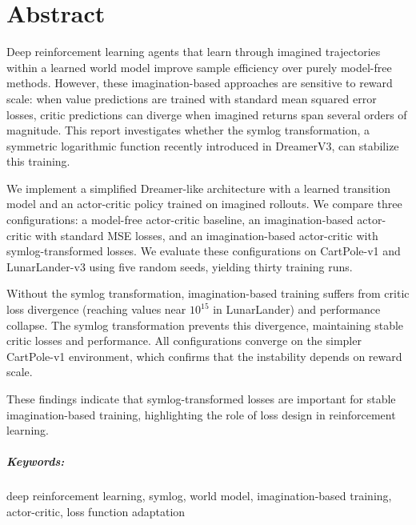 \chapter*{\center \Large Abstract}

Deep reinforcement learning agents that learn through imagined trajectories within a learned world model improve sample efficiency over purely model-free methods. However, these imagination-based approaches are sensitive to reward scale: when value predictions are trained with standard mean squared error losses, critic predictions can diverge when imagined returns span several orders of magnitude. This report investigates whether the symlog transformation, a symmetric logarithmic function recently introduced in DreamerV3, can stabilize this training.

We implement a simplified Dreamer-like architecture with a learned transition model and an actor-critic policy trained on imagined rollouts. We compare three configurations: a model-free actor-critic baseline, an imagination-based actor-critic with standard MSE losses, and an imagination-based actor-critic with symlog-transformed losses. We evaluate these configurations on CartPole-v1 and LunarLander-v3 using five random seeds, yielding thirty training runs.

Without the symlog transformation, imagination-based training suffers from critic loss divergence (reaching values near $10^{15}$ in LunarLander) and performance collapse. The symlog transformation prevents this divergence, maintaining stable critic losses and performance. All configurations converge on the simpler CartPole-v1 environment, which confirms that the instability depends on reward scale.

These findings indicate that symlog-transformed losses are important for stable imagination-based training, highlighting the role of loss design in reinforcement learning.

\paragraph{Keywords:} deep reinforcement learning, symlog, world model, imagination-based training, actor-critic, loss function adaptation
